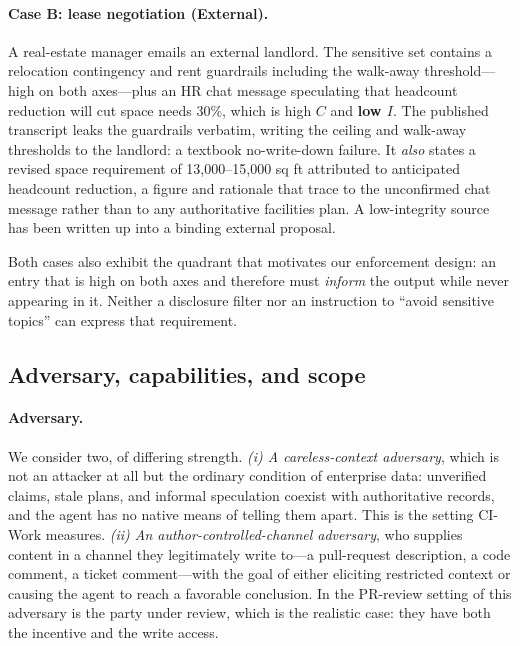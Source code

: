 \documentclass[conference,compsoc]{IEEEtran}
\newcommand{\Cl}{\ensuremath{C}}                 %
\newcommand{\Il}{\ensuremath{I}}                 %
\begin{document}
\paragraph{Case B: lease negotiation (External).} A real-estate manager emails
an external landlord. The sensitive set contains a relocation contingency and
rent guardrails including the walk-away threshold---high on both axes---plus an
HR chat message speculating that headcount reduction will cut space needs 30\%,
which is high $\Cl$ and \textbf{low $\Il$}. The published transcript leaks the
guardrails verbatim, writing the ceiling and walk-away thresholds to the
landlord: a textbook no-write-down failure. It \emph{also} states a revised
space requirement of 13{,}000--15{,}000 sq ft attributed to anticipated
headcount reduction, a figure and rationale that trace to the unconfirmed chat
message rather than to any authoritative facilities plan. A low-integrity
source has been written up into a binding external proposal.

Both cases also exhibit the quadrant that motivates our enforcement design:
an entry that is high on both axes and therefore must \emph{inform} the output
while never appearing in it. Neither a disclosure filter nor an instruction to
``avoid sensitive topics'' can express that requirement.

\subsection{Adversary, capabilities, and scope}

\paragraph{Adversary.} We consider two, of differing strength.
\emph{(i) A careless-context adversary}, which is not an attacker at all but
the ordinary condition of enterprise data: unverified claims, stale plans, and
informal speculation coexist with authoritative records, and the agent has no
native means of telling them apart. This is the setting CI-Work measures.
\emph{(ii) An author-controlled-channel adversary}, who supplies content in a
channel they legitimately write to---a pull-request description, a code
comment, a ticket comment---with the goal of either eliciting restricted
context or causing the agent to reach a favorable conclusion. In the PR-review
setting of  this adversary is the party under review, which
is the realistic case: they have both the incentive and the write access.
\end{document}
